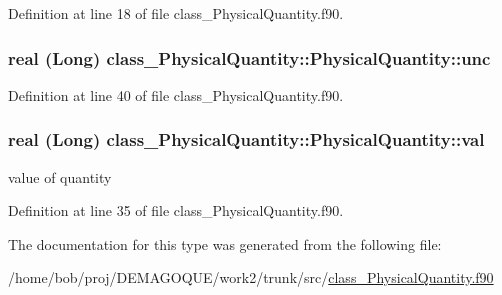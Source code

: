 Definition at line 18 of file class\_\-PhysicalQuantity.f90.

\hypertarget{typeclass__PhysicalQuantity_1_1PhysicalQuantity_abb0c17659fe335d551d4e715b84e9743}{
\subsubsection[{unc}]{\setlength{\rightskip}{0pt plus 5cm}real (Long) {\bf class\_\-PhysicalQuantity::PhysicalQuantity::unc}}}
\label{typeclass__PhysicalQuantity_1_1PhysicalQuantity_abb0c17659fe335d551d4e715b84e9743}


Definition at line 40 of file class\_\-PhysicalQuantity.f90.

\hypertarget{typeclass__PhysicalQuantity_1_1PhysicalQuantity_ae362510ba84f98322e31cd40193a4d26}{
\subsubsection[{val}]{\setlength{\rightskip}{0pt plus 5cm}real (Long) {\bf class\_\-PhysicalQuantity::PhysicalQuantity::val}}}
\label{typeclass__PhysicalQuantity_1_1PhysicalQuantity_ae362510ba84f98322e31cd40193a4d26}


value of quantity 



Definition at line 35 of file class\_\-PhysicalQuantity.f90.



The documentation for this type was generated from the following file:\begin{DoxyCompactItemize}
\item 
/home/bob/proj/DEMAGOQUE/work2/trunk/src/\hyperlink{class__PhysicalQuantity_8f90}{class\_\-PhysicalQuantity.f90}\end{DoxyCompactItemize}
